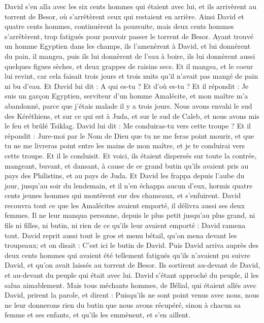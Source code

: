 \begin{multicols}{2}
David s'en alla avec les six cents hommes qui étaient avec lui, et ils arrivèrent au torrent de Besor, où s'arrêtèrent ceux qui restaient en arrière.
Ainsi David et quatre cents hommes, continuèrent la poursuite, mais deux cents hommes s'arrêtèrent, trop fatigués pour pouvoir passer le torrent de Besor.
Ayant trouvé un homme Egyptien dans les champs, ils l'amenèrent à David, et lui donnèrent du pain, il mangea, puis ils lui donnèrent de l'eau à boire,
ils lui donnèrent aussi quelques figues sèches, et deux grappes de raisins secs. Et il mangea, et le coeur lui revint, car cela faisait trois jours et trois nuits qu'il n'avait pas mangé de pain ni bu d'eau.
Et David lui dit : A qui es-tu ? Et d'où es-tu ? Et il répondit : Je suis un garçon Egyptien, serviteur d'un homme Amalécite, et mon maître m'a abandonné, parce que j'étais malade il y a trois jours.
Nous avons envahi le sud des Kéréthiens, et sur ce qui est à Juda, et sur le sud de Caleb, et nous avons mis le feu et brûlé Tsiklag.
David lui dit : Me conduiras-tu vers cette troupe ? Et il répondit : Jure-moi par le Nom de Dieu que tu ne me feras point mourir, et que tu ne me livreras point entre les mains de mon maître, et je te conduirai vers cette troupe.
Et il le conduisit. Et voici, ils étaient dispersés sur toute la contrée, mangeant, buvant, et dansant, à cause de ce grand butin qu'ils avaient pris au pays des Philistins, et au pays de Juda.
Et David les frappa depuis l'aube du jour, jusqu'au soir du lendemain, et il n'en échappa aucun d'eux, hormis quatre cents jeunes hommes qui montèrent sur des chameaux, et s'enfuirent.
David recouvra tout ce que les Amalécites avaient emporté, il délivra aussi ses deux femmes.
Il ne leur manqua personne, depuis le plus petit jusqu'au plus grand, ni fils ni filles, ni butin, ni rien de ce qu'ils leur avaient emporté : David ramena tout.
David reprit aussi tout le gros et menu bétail, qu'on mena devant les troupeaux; et on disait : C'est ici le butin de David.
Puis David arriva auprès des deux cents hommes qui avaient été tellement fatigués qu'ils n'avaient pu suivre David, et qu'on avait laissés au torrent de Besor. Ils sortirent au-devant de David, et au-devant du peuple qui était avec lui. David s'étant approché du peuple, il les salua aimablement.
Mais tous méchants hommes, de Bélial, qui étaient allés avec David, prirent la parole, et dirent : Puisqu'ils ne sont point venus avec nous, nous ne leur donnerons rien du butin que nous avons récupéré, sinon à chacun sa femme et ses enfants, et qu'ils les emmènent, et s'en aillent.

\end{multicols}
